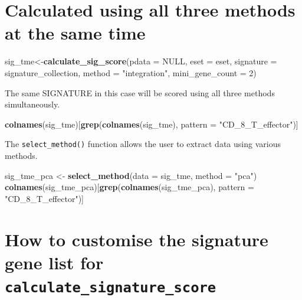 \documentclass[
  12pt,
]{book}
\newenvironment{Shaded}{\begin{snugshade}}{\end{snugshade}}
\newcommand{\AttributeTok}[1]{\textcolor[rgb]{0.13,0.29,0.53}{#1}}
\newcommand{\ConstantTok}[1]{\textcolor[rgb]{0.56,0.35,0.01}{#1}}
\newcommand{\DecValTok}[1]{\textcolor[rgb]{0.00,0.00,0.81}{#1}}
\newcommand{\FunctionTok}[1]{\textcolor[rgb]{0.13,0.29,0.53}{\textbf{#1}}}
\newcommand{\NormalTok}[1]{#1}
\newcommand{\OtherTok}[1]{\textcolor[rgb]{0.56,0.35,0.01}{#1}}
\newcommand{\StringTok}[1]{\textcolor[rgb]{0.31,0.60,0.02}{#1}}
\begin{document}
\hypertarget{calculated-using-all-three-methods-at-the-same-time}{%
\section{Calculated using all three methods at the same time}\label{calculated-using-all-three-methods-at-the-same-time}}

\begin{Shaded}
\begin{Highlighting}[]
\NormalTok{sig\_tme}\OtherTok{\textless{}{-}}\FunctionTok{calculate\_sig\_score}\NormalTok{(}\AttributeTok{pdata           =} \ConstantTok{NULL}\NormalTok{,}
                             \AttributeTok{eset            =}\NormalTok{ eset,}
                             \AttributeTok{signature       =}\NormalTok{ signature\_collection,}
                             \AttributeTok{method          =} \StringTok{"integration"}\NormalTok{,}
                             \AttributeTok{mini\_gene\_count =} \DecValTok{2}\NormalTok{)}
\end{Highlighting}
\end{Shaded}

The same SIGNATURE in this case will be scored using all three methods simultaneously.

\begin{Shaded}
\begin{Highlighting}[]
\FunctionTok{colnames}\NormalTok{(sig\_tme)[}\FunctionTok{grep}\NormalTok{(}\FunctionTok{colnames}\NormalTok{(sig\_tme), }\AttributeTok{pattern =} \StringTok{"CD\_8\_T\_effector"}\NormalTok{)]}
\end{Highlighting}
\end{Shaded}

The \texttt{select\_method()} function allows the user to extract data using various methods.

\begin{Shaded}
\begin{Highlighting}[]
\NormalTok{sig\_tme\_pca }\OtherTok{\textless{}{-}} \FunctionTok{select\_method}\NormalTok{(}\AttributeTok{data =}\NormalTok{ sig\_tme, }\AttributeTok{method =} \StringTok{"pca"}\NormalTok{)}
\FunctionTok{colnames}\NormalTok{(sig\_tme\_pca)[}\FunctionTok{grep}\NormalTok{(}\FunctionTok{colnames}\NormalTok{(sig\_tme\_pca), }\AttributeTok{pattern =} \StringTok{"CD\_8\_T\_effector"}\NormalTok{)]}
\end{Highlighting}
\end{Shaded}

\hypertarget{how-to-customise-the-signature-gene-list-for-calculate_signature_score}{%
\section{\texorpdfstring{How to customise the signature gene list for \texttt{calculate\_signature\_score}}{How to customise the signature gene list for calculate\_signature\_score}}\label{how-to-customise-the-signature-gene-list-for-calculate_signature_score}}
\end{document}
